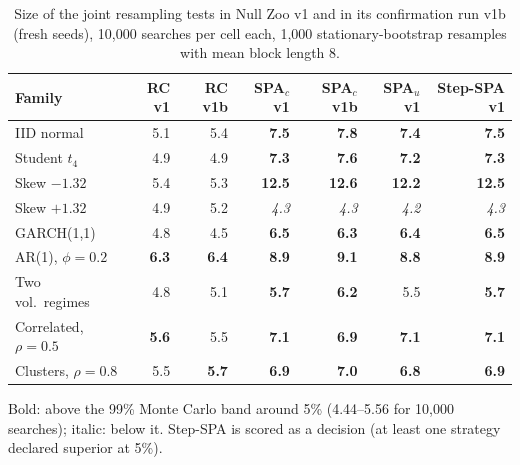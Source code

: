 \begin{table}[t]
\centering
\small
\caption{Size of the joint resampling tests in Null Zoo v1 and in its confirmation run v1b (fresh seeds), 10{,}000 searches per cell each, 1{,}000 stationary-bootstrap resamples with mean block length 8.}
\label{tab:size-joint}
\begin{tabular}{lrrrrrr}
\toprule
Family & RC v1 & RC v1b & SPA$_c$ v1 & SPA$_c$ v1b & SPA$_u$ v1 & Step-SPA v1 \\
\midrule
IID normal & 5.1 & 5.4 & \textbf{7.5} & \textbf{7.8} & \textbf{7.4} & \textbf{7.5} \\
Student $t_4$ & 4.9 & 4.9 & \textbf{7.3} & \textbf{7.6} & \textbf{7.2} & \textbf{7.3} \\
Skew $-1.32$ & 5.4 & 5.3 & \textbf{12.5} & \textbf{12.6} & \textbf{12.2} & \textbf{12.5} \\
Skew $+1.32$ & 4.9 & 5.2 & \textit{4.3} & \textit{4.3} & \textit{4.2} & \textit{4.3} \\
GARCH(1,1) & 4.8 & 4.5 & \textbf{6.5} & \textbf{6.3} & \textbf{6.4} & \textbf{6.5} \\
AR(1), $\phi=0.2$ & \textbf{6.3} & \textbf{6.4} & \textbf{8.9} & \textbf{9.1} & \textbf{8.8} & \textbf{8.9} \\
Two vol.\ regimes & 4.8 & 5.1 & \textbf{5.7} & \textbf{6.2} & 5.5 & \textbf{5.7} \\
Correlated, $\rho=0.5$ & \textbf{5.6} & 5.5 & \textbf{7.1} & \textbf{6.9} & \textbf{7.1} & \textbf{7.1} \\
Clusters, $\rho=0.8$ & 5.5 & \textbf{5.7} & \textbf{6.9} & \textbf{7.0} & \textbf{6.8} & \textbf{6.9} \\
\bottomrule
\end{tabular}
\par\smallskip\begin{minipage}{0.97\linewidth}\footnotesize Bold: above the 99\% Monte Carlo band around 5\% (4.44--5.56 for 10{,}000 searches); italic: below it. Step-SPA is scored as a decision (at least one strategy declared superior at 5\%).\end{minipage}
\end{table}

